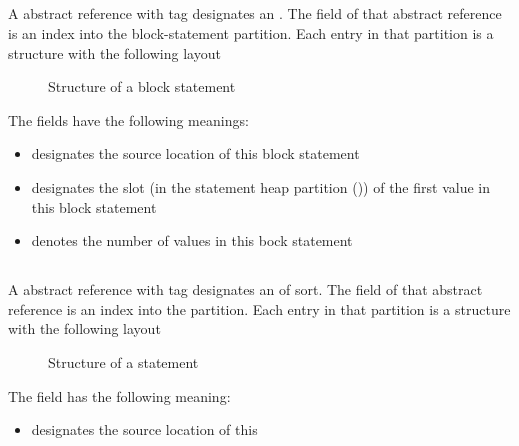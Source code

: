 

\subsection{}
\label{sec:ifc:StmtSort:Block}

A  abstract reference with tag  designates an .
The  field of that abstract reference is an index into the block-statement partition.
Each entry in that partition is a structure with the following layout
%
\begin{figure}[H]
	\centering
	\caption{Structure of a block statement}
	\label{fig:ifc-block-stmt-structure}
\end{figure}

The fields have the following meanings:
\begin{itemize}
	\item {} designates the source location of this block statement
	\item {} designates the slot (in the statement heap partition ()) of the first  value in this block statement
	\item {} denotes the number of  values in this bock statement 
\end{itemize}





\subsection{}
\label{sec:ifc:StmtSort:Break}

A  abstract reference with tag  designates an  of  sort.
The  field of that abstract reference is an index into the  partition.
Each entry in that partition is a structure with the following layout
%
\begin{figure}[H]
	\centering
	\caption{Structure of a  statement}
	\label{fig:ifc-break-stmt-structure}
\end{figure}
%
The field has the following meaning:
\begin{itemize}
	\item {} designates the source location of this 
\end{itemize}

